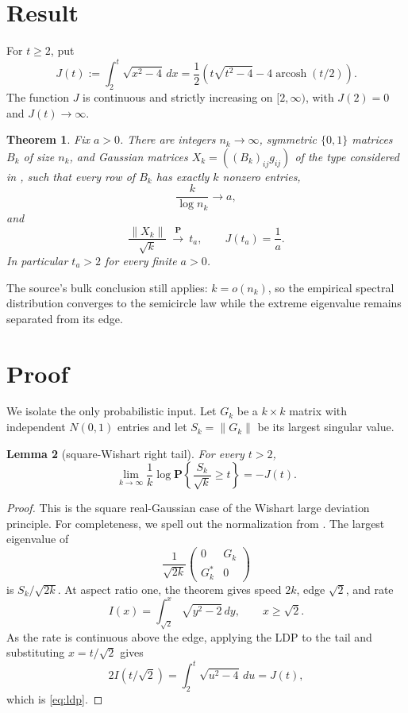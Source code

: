 \documentclass[11pt]{article}
\newtheorem{theorem}{Theorem}
\newtheorem{lemma}[theorem]{Lemma}
\newcommand{\Pp}{\mathbf P}
\begin{document}
\section{Result}

For $t\ge2$, put
\begin{equation}
 J(t):=\int_2^t\sqrt{x^2-4}\,dx
 =\frac12\left(t\sqrt{t^2-4}-4\operatorname{arcosh}(t/2)\right).
 \label{eq:J}
\end{equation}
The function $J$ is continuous and strictly increasing on $[2,\infty)$,
with $J(2)=0$ and $J(t)\to\infty$.

\begin{theorem}\label{thm:main}
Fix $a>0$.  There are integers $n_k\to\infty$, symmetric
$\{0,1\}$ matrices $B_k$ of size $n_k$, and Gaussian matrices
$X_k=((B_k)_{ij}g_{ij})$ of the type considered in \cite{BvH}, such that
every row of $B_k$ has exactly $k$ nonzero entries,
\[
 \frac{k}{\log n_k}\longrightarrow a,
\]
and
\begin{equation}
 \frac{\|X_k\|}{\sqrt{k}}\ \xrightarrow{\ \Pp\ }\ t_a,
 \qquad J(t_a)=\frac1a .
 \label{eq:limit}
\end{equation}
In particular $t_a>2$ for every finite $a>0$.
\end{theorem}

The source's bulk conclusion still applies: $k=o(n_k)$, so the empirical
spectral distribution converges to the semicircle law while the extreme
eigenvalue remains separated from its edge.

\section{Proof}

We isolate the only probabilistic input.  Let $G_k$ be a $k\times k$
matrix with independent $N(0,1)$ entries and let $S_k=\|G_k\|$ be its
largest singular value.

\begin{lemma}[square-Wishart right tail]\label{lem:ldp}
For every $t>2$,
\begin{equation}
 \lim_{k\to\infty}\frac1k
 \log\Pp\left\{\frac{S_k}{\sqrt{k}}\ge t\right\}=-J(t).
 \label{eq:ldp}
\end{equation}
\end{lemma}

\begin{proof}
This is the square real-Gaussian case of the Wishart large deviation
principle.  For completeness, we spell out the normalization from
\cite[Theorem~1.7]{GH}.  The largest eigenvalue of
\[
 \frac1{\sqrt{2k}}
 \begin{pmatrix}0&G_k\\G_k^*&0\end{pmatrix}
\]
is $S_k/\sqrt{2k}$.  At aspect ratio one, the theorem gives speed $2k$,
edge $\sqrt2$, and rate
\[
 I(x)=\int_{\sqrt2}^{x}\sqrt{y^2-2}\,dy,
 \qquad x\ge\sqrt2.
\]
As the rate is continuous above the edge, applying the LDP to the tail and
substituting $x=t/\sqrt2$ gives
\[
 2I(t/\sqrt2)
 =\int_2^t\sqrt{u^2-4}\,du=J(t),
\]
which is \eqref{eq:ldp}.
\end{proof}
\end{document}
